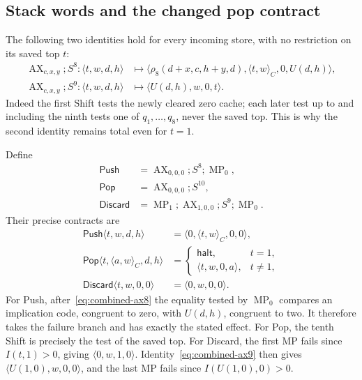 \subsection{Stack words and the changed pop contract}

The following two identities hold for every incoming store, with no
restriction on its saved top $t$:
\begin{align}
 \operatorname{AX}_{c,x,y};S^8:
 \langle t,w,d,h\rangle
 &\longmapsto
 \langle\rho_8(d+x,c,h+y,d),\langle t,w\rangle_C,0,U(d,h)\rangle,
 \label{eq:combined-ax8}\\
 \operatorname{AX}_{c,x,y};S^9:
 \langle t,w,d,h\rangle
 &\longmapsto\langle U(d,h),w,0,t\rangle.
 \label{eq:combined-ax9}
\end{align}
Indeed the first Shift tests the newly cleared zero cache; each later test
up to and including the ninth tests one of $q_1,\ldots,q_8$, never the saved
top.  This is why the second identity remains total even for $t=1$.

Define
\begin{align*}
 \mathsf{Push}&=\operatorname{AX}_{0,0,0};S^8;\operatorname{MP}_0,\\
 \mathsf{Pop}&=\operatorname{AX}_{0,0,0};S^{10},\\
 \mathsf{Discard}&=\operatorname{MP}_1;\operatorname{AX}_{1,0,0};S^9;
                    \operatorname{MP}_0.
\end{align*}
Their precise contracts are
\begin{align}
 \mathsf{Push}\langle t,w,d,h\rangle
   &=\langle0,\langle t,w\rangle_C,0,0\rangle,
   \label{eq:combined-push}\\
 \mathsf{Pop}\langle t,\langle a,w\rangle_C,d,h\rangle
   &=\begin{cases}\mathsf{halt},&t=1,\\
                  \langle t,w,0,a\rangle,&t\ne1,
      \end{cases}
   \label{eq:combined-pop}\\
 \mathsf{Discard}\langle t,w,0,0\rangle
   &=\langle0,w,0,0\rangle.
   \label{eq:combined-discard}
\end{align}
For Push, after~\eqref{eq:combined-ax8} the equality tested by
$\operatorname{MP}_0$ compares an implication code, congruent to zero, with
$U(d,h)$, congruent to two.  It therefore takes the failure branch and has
exactly the stated effect.  For Pop, the tenth Shift is precisely the test
of the saved top.  For Discard, the first MP fails since $I(t,1)>0$, giving
$\langle0,w,1,0\rangle$.  Identity~\eqref{eq:combined-ax9} then gives
$\langle U(1,0),w,0,0\rangle$, and the last MP fails since $I(U(1,0),0)>0$.

